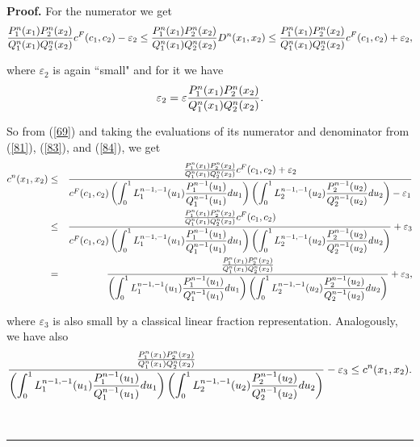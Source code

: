 \documentclass[onecolumn]{article}
\providecommand{\dint}{\displaystyle\int}
\newenvironment{proof}[1][Proof]{\noindent\textbf{#1.} }{\ \rule{0.5em}{0.5em}}
\renewcommand{\dint}{\displaystyle\int}
\begin{document}
\begin{proof}
For the numerator we get%
\begin{equation}
\frac{P_{1}^{n}(x_{1})P_{2}^{n}(x_{2})}{Q_{1}^{n}(x_{1})Q_{2}^{n}(x_{2})}%
c^{F}(c_{1},c_{2})-\varepsilon _{2}\leq \frac{%
P_{1}^{n}(x_{1})P_{2}^{n}(x_{2})}{Q_{1}^{n}(x_{1})Q_{2}^{n}(x_{2})}%
D^{n}(x_{1},x_{2})\leq \frac{P_{1}^{n}(x_{1})P_{2}^{n}(x_{2})}{%
Q_{1}^{n}(x_{1})Q_{2}^{n}(x_{2})}c^{F}(c_{1},c_{2})+\varepsilon _{2},
\label{84}
\end{equation}

where $\varepsilon _{2}$ is again \textquotedblleft small" and for it we have%
\begin{equation}
\varepsilon _{2}=\varepsilon \frac{P_{1}^{n}(x_{1})P_{2}^{n}(x_{2})}{%
Q_{1}^{n}(x_{1})Q_{2}^{n}(x_{2})}.  \label{85}
\end{equation}

So from (\ref{69}) and taking the evaluations of its numerator and
denominator from (\ref{81}), (\ref{83}), and (\ref{84}), we get%
\begin{eqnarray}
c^{n}(x_{1},x_{2}) &\leq &\frac{\frac{P_{1}^{n}(x_{1})P_{2}^{n}(x_{2})}{%
Q_{1}^{n}(x_{1})Q_{2}^{n}(x_{2})}c^{F}(c_{1},c_{2})+\varepsilon _{2}}{%
c^{F}(c_{1},c_{2})\left( \dint\nolimits_{0}^{1}L_{1}^{n-1,-1}(u_{1})\frac{%
P_{1}^{n-1}(u_{1})}{Q_{1}^{n-1}(u_{1})}du_{1}\right) \left(
\dint\nolimits_{0}^{1}L_{2}^{n-1,-1}(u_{2})\frac{P_{2}^{n-1}(u_{2})}{%
Q_{2}^{n-1}(u_{2})}du_{2}\right) -\varepsilon _{1}}  \notag \\
&\leq &\frac{\frac{P_{1}^{n}(x_{1})P_{2}^{n}(x_{2})}{%
Q_{1}^{n}(x_{1})Q_{2}^{n}(x_{2})}c^{F}(c_{1},c_{2})}{c^{F}(c_{1},c_{2})%
\left( \dint\nolimits_{0}^{1}L_{1}^{n-1,-1}(u_{1})\frac{P_{1}^{n-1}(u_{1})}{%
Q_{1}^{n-1}(u_{1})}du_{1}\right) \left(
\dint\nolimits_{0}^{1}L_{2}^{n-1,-1}(u_{2})\frac{P_{2}^{n-1}(u_{2})}{%
Q_{2}^{n-1}(u_{2})}du_{2}\right) }+\varepsilon _{3}  \notag \\
&=&\frac{\frac{P_{1}^{n}(x_{1})P_{2}^{n}(x_{2})}{%
Q_{1}^{n}(x_{1})Q_{2}^{n}(x_{2})}}{\left(
\dint\nolimits_{0}^{1}L_{1}^{n-1,-1}(u_{1})\frac{P_{1}^{n-1}(u_{1})}{%
Q_{1}^{n-1}(u_{1})}du_{1}\right) \left(
\dint\nolimits_{0}^{1}L_{2}^{n-1,-1}(u_{2})\frac{P_{2}^{n-1}(u_{2})}{%
Q_{2}^{n-1}(u_{2})}du_{2}\right) }+\varepsilon _{3},  \label{86}
\end{eqnarray}

where $\varepsilon _{3}$ is also small by a classical linear fraction
representation. Analogously, we have also%
\begin{equation}
\frac{\frac{P_{1}^{n}(x_{1})P_{2}^{n}(x_{2})}{%
Q_{1}^{n}(x_{1})Q_{2}^{n}(x_{2})}}{\left(
\dint\nolimits_{0}^{1}L_{1}^{n-1,-1}(u_{1})\frac{P_{1}^{n-1}(u_{1})}{%
Q_{1}^{n-1}(u_{1})}du_{1}\right) \left(
\dint\nolimits_{0}^{1}L_{2}^{n-1,-1}(u_{2})\frac{P_{2}^{n-1}(u_{2})}{%
Q_{2}^{n-1}(u_{2})}du_{2}\right) }-\varepsilon _{3}\leq c^{n}(x_{1},x_{2}).
\label{87}
\end{equation}


\end{proof}
\end{document}
